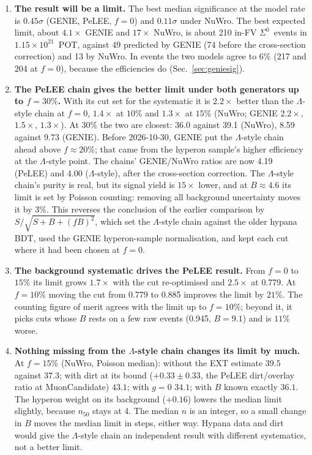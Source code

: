 \documentclass[11pt,a4paper]{article}
\newcommand{\Szero}{\ensuremath{\Sigma^{0}}}
\newcommand{\Lam}{\ensuremath{\Lambda}}
\begin{document}
\begin{enumerate}
  \item \textbf{The result will be a limit.} The best median significance at the model
        rate is $0.45\sigma$ (GENIE, PeLEE, $f=0$) and $0.11\sigma$ under NuWro. The best
        expected limit, about $4.1\times$ GENIE and $17\times$ NuWro, is about 210 in-FV
        \Szero\ events in $1.15\times10^{21}$~POT, against 49 predicted by GENIE (74
        before the cross-section correction) and 13 by NuWro. In events the two models
        agree to $6\%$ (217 and 204 at $f=0$),
        because the efficiencies do (Sec.~\ref{sec:geniesig}).
  \item \textbf{The PeLEE chain gives the better limit under both generators up to
        $f=30\%$.} With its cut set for the systematic it is $2.2\times$ better than the
        \Lam-style chain at $f=0$, $1.4\times$ at $10\%$ and $1.3\times$ at $15\%$
        (NuWro; GENIE $2.2\times$, $1.5\times$, $1.3\times$). At $30\%$ the two are
        closest: 36.0 against 39.1 (NuWro), 8.59 against 9.73 (GENIE). Before 2026-10-30, GENIE
        put the \Lam-style chain ahead above $f\approx20\%$; that came from the hyperon
        sample's higher efficiency at the \Lam-style point. The chains' GENIE/NuWro ratios
        are now 4.19 (PeLEE) and 4.00 (\Lam-style), after the cross-section correction. The \Lam-style chain's
        purity is real, but its signal yield is $15\times$ lower, and at $B\approx4.6$ its
        limit is set by Poisson counting: removing all background uncertainty moves it
        by $3\%$. This reverses the conclusion of the earlier comparison by
        $S/\sqrt{S+B+(fB)^2}$, which set the \Lam-style chain against the older hypana
        BDT, used the GENIE hyperon-sample normalisation, and kept each cut where it had
        been chosen at $f=0$.
  \item \textbf{The background systematic drives the PeLEE result.} From $f=0$ to
        $15\%$ its limit grows $1.7\times$ with the cut re-optimised and $2.5\times$ at
        0.779. At $f=10\%$ moving the cut from 0.779 to 0.885 improves the limit by
        $21\%$. The counting figure of merit agrees with the limit up to $f=10\%$; beyond
        it, it picks cuts whose $B$ rests on a few raw events (0.945, $B=9.1$) and is
        $11\%$ worse.
  \item \textbf{Nothing missing from the \Lam-style chain changes its limit by much.}
        At $f=15\%$ (NuWro, Poisson median): without the EXT estimate $39.5$ against
        $37.3$; with dirt at its bound ($+0.33\pm0.33$, the PeLEE dirt/overlay ratio at
        MuonCandidate) $43.1$; with $g=0$ $34.1$; with $B$ known exactly $36.1$. The hyperon
        weight on its background ($+0.16$) lowers the median limit slightly, because $n_{50}$
        stays at 4. The
        median $n$ is an integer, so a small change in $B$ moves the median limit in
        steps, either way. Hypana data and dirt would give the \Lam-style chain an
        independent result with different systematics, not a better limit.
\end{enumerate}
\end{document}
